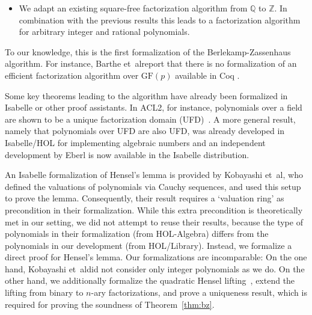 \documentclass[11pt,a4paper]{article}
\newcommand\rats{\mathbb{Q}}
\newcommand\ints{\mathbb{Z}}
\newcommand\GFpp[1]{\ensuremath{\text{GF}(#1)}}
\newcommand\GFp{\GFpp{p}}
\newcommand\rTH[1]{Theorem~\ref{#1}}
\newcommand\etal{{et~al}\myDot}
\begin{document}
\begin{itemize}
\item We adapt an existing square-free factorization algorithm from
  $\rats$ to $\ints$. In combination with the previous results this leads to a factorization algorithm
  for arbitrary integer and rational polynomials. 

%  
%
\end{itemize}

To our knowledge, this is the first formalization of the Berlekamp-Zassenhaus algorithm.
For instance, Barthe \etal report that there is no formalization of an efficient factorization algorithm over $\GFp$ available in Coq \cite[Section 6, note 3 on formalization]{NoCoqFactorization}.

Some key theorems leading to the algorithm have already been
formalized in Isabelle or other proof assistants.
In ACL2, for instance, polynomials over a field are shown to be a unique factorization domain
(UFD)~\cite{cowles2006unique}.
A more general result,
namely that polynomials over UFD are also UFD,
was already developed in Isabelle/HOL for implementing algebraic numbers \cite{TY16}
and an independent development by Eberl is now available in the Isabelle distribution.

An Isabelle formalization of Hensel's lemma is provided by Kobayashi \etal \cite{Kobayashi2005},
who defined the valuations of polynomials via Cauchy sequences, and used this setup to prove the lemma.
Consequently, their result requires a `valuation ring' as precondition in their formalization.
While this extra precondition is theoretically met in our setting,
we did not attempt to reuse their results,
because the type of polynomials in their formalization (from HOL-Algebra) differs 
from the polynomials in our development (from HOL/Library).
Instead, we formalize a direct proof for Hensel's lemma.
Our formalizations are incomparable:
On the one hand, Kobayashi \etal did not consider only integer polynomials as we do.
On the other hand, we additionally formalize the quadratic Hensel lifting~\cite{Zassenhaus69},
extend the lifting from binary to $n$-ary factorizations,
and prove a uniqueness result,
which is required for proving the soundness of \rTH{thm:bz}.
\end{document}
